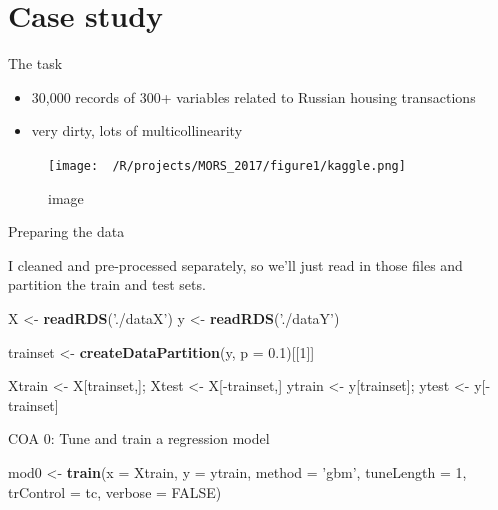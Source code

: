\documentclass[ignorenonframetext,]{beamer}
\newenvironment{Shaded}{\begin{snugshade}}{\end{snugshade}}
\newcommand{\KeywordTok}[1]{\textcolor[rgb]{0.13,0.29,0.53}{\textbf{{#1}}}}
\newcommand{\DataTypeTok}[1]{\textcolor[rgb]{0.13,0.29,0.53}{{#1}}}
\newcommand{\DecValTok}[1]{\textcolor[rgb]{0.00,0.00,0.81}{{#1}}}
\newcommand{\FloatTok}[1]{\textcolor[rgb]{0.00,0.00,0.81}{{#1}}}
\newcommand{\StringTok}[1]{\textcolor[rgb]{0.31,0.60,0.02}{{#1}}}
\newcommand{\OtherTok}[1]{\textcolor[rgb]{0.56,0.35,0.01}{{#1}}}
\newcommand{\NormalTok}[1]{{#1}}
\providecommand{\tightlist}{%
\setlength{\itemsep}{0pt}\setlength{\parskip}{0pt}}
\begin{document}
\section{Case study}\label{case-study}

\begin{frame}{The task}

\begin{itemize}
\tightlist
\item
  30,000 records of 300+ variables related to Russian housing
  transactions
\item
  very dirty, lots of multicollinearity
\end{itemize}

\begin{figure}[htbp]
\centering
\texttt{[image: ~/R/projects/MORS\_2017/figure1/kaggle.png]}
\caption{image}
\end{figure}

\end{frame}

\begin{frame}[fragile]{Preparing the data}

I cleaned and pre-processed separately, so we'll just read in those
files and partition the train and test sets.

\footnotesize

\begin{Shaded}
\begin{Highlighting}[]
\NormalTok{X <-}\StringTok{ }\KeywordTok{readRDS}\NormalTok{(}\StringTok{'./dataX'}\NormalTok{)}
\NormalTok{y <-}\StringTok{ }\KeywordTok{readRDS}\NormalTok{(}\StringTok{'./dataY'}\NormalTok{)}

\NormalTok{trainset <-}\StringTok{ }\KeywordTok{createDataPartition}\NormalTok{(y, }\DataTypeTok{p =} \FloatTok{0.1}\NormalTok{)[[}\DecValTok{1}\NormalTok{]]}

\NormalTok{Xtrain <-}\StringTok{ }\NormalTok{X[trainset,]; Xtest <-}\StringTok{ }\NormalTok{X[-trainset,]}
\NormalTok{ytrain <-}\StringTok{ }\NormalTok{y[trainset]; ytest <-}\StringTok{ }\NormalTok{y[-trainset]}
\end{Highlighting}
\end{Shaded}

\end{frame}

\begin{frame}[fragile]{COA 0: Tune and train a regression model}

\footnotesize

\begin{Shaded}
\begin{Highlighting}[]
\NormalTok{mod0 <-}\StringTok{ }\KeywordTok{train}\NormalTok{(}\DataTypeTok{x =} \NormalTok{Xtrain, }\DataTypeTok{y =} \NormalTok{ytrain, }\DataTypeTok{method =} \StringTok{'gbm'}\NormalTok{,}
              \DataTypeTok{tuneLength =} \DecValTok{1}\NormalTok{, }\DataTypeTok{trControl =} \NormalTok{tc,}
              \DataTypeTok{verbose =} \OtherTok{FALSE}\NormalTok{)}
\end{Highlighting}
\end{Shaded}

\end{frame}
\end{document}
